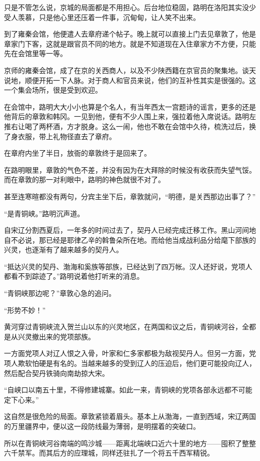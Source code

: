 只是不管怎么说，京城的局面都是不用担心。后台地位稳固，路明在洛阳其实没少受人羡慕，只是他心里还压着一件事，沉甸甸，让人笑不出来。

到了雍秦会馆，他便遣人去章府递个帖子。晚上就可以直接上门去见章敦了，他是章家门下客，这就是跟官员不同的地方。就是不知道现在入住章家方不方便，只能先在会馆里等一等。

京师的雍秦会馆，成了在京的关西商人，以及不少陕西籍在京官员的聚集地。谈天说地，顺便开拓一下人脉。对于商人和官员来说，他们的互补性其实是很强的。这一个集会场所，很是受到欢迎。

在会馆中，路明大大小小也算是个名人，有当年西太一宫题诗的谣言，更多的还是他背后的章敦和韩冈。一见到他，便有不少人围上来，强拉着他入席说话。路明左推右让喝了两杯酒，方才脱身。这么一闹，他也不敢在会馆中久待，梳洗过后，换了身衣服，带上礼物径直去了章府。

在章府内坐了半日，放衙的章敦终于是回来了。

在路明眼里，章敦的气色不差，并没有因为在大拜除的时候没有收获而失望气馁。而在章敦的那一对利眼中，路明的神色就很不对了。

甚至连寒暄都没有两句，分宾主坐下后，章敦就问，“明德，是关西那边出事了？”

“是青铜峡。”路明沉声道。

自宋辽分割西夏后，一年多的时间过去了，契丹人已经完成迁移工作。黑山河间地自不必说，那已经是耶律乙辛的斡鲁朵所在地。而给他当成战利品分给麾下部族的兴灵，也逐渐有了越来越多的契丹人。

“抵达兴灵的契丹、渤海和奚族等部族，已经达到了四万帐。汉人还好说，党项人都看不到踪迹了。”路明说着他打听来的消息。

“青铜峡那边呢？”章敦心急的追问。

“形势不妙！”

黄河穿过青铜峡流入贺兰山以东的兴灵地区，在两国和议之后，青铜峡河谷，全都是从兴灵撤出来的党项部族。

一方面党项人对辽人恨之入骨，叶家和仁多家都极为敌视契丹人。但另一方面，党项人欺软怕硬是有名的。当越来越多的受到辽人的压迫后，他们更可能投向辽人，然后配合契丹铁骑向南劫掠大宋。

“自峡口以南五十里，不得修建城寨。如此一来，青铜峡的党项各部永远都不可能定下心来。”

这自然是很危险的局面。章敦紧锁着眉头。基本上从渤海，一直到西域，宋辽两国的万里疆界中，便以这一段防线最为薄弱，是明摆着的突破口。

所以在青铜峡河谷南端的鸣沙城——距离北端峡口近六十里的地方——囤积了整整六千禁军。而其后方的应理城，同样还驻扎了一个将五千西军精锐。

